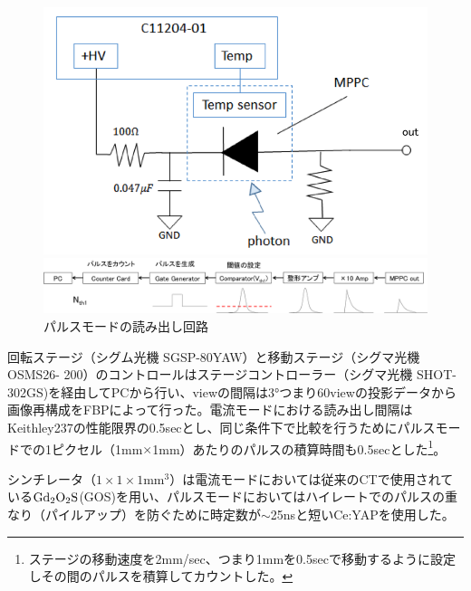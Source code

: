 \begin{figure}[H]
 \begin{minipage}{0.5\vsize}
 \hspace{3 cm}
   \includegraphics[bb=0.000000 0.000000 377.728774 242.859924,width=0.8\hsize]{image2/chapter5/read_circuit_pulse.png} 
  \vspace{0 cm}
   \end{minipage}
 \begin{minipage}{0.5\vsize}  
  \hspace{-1 cm}
 \includegraphics[bb=0.000000 0.000000 1008.876600 145.907938,width=1.5\hsize]{image2/chapter5/read_circuit_pulse2.png} 
 \end{minipage}
 \begin{center}
  \caption{パルスモードの読み出し回路}
  \label{fig:read_circuit_current}
  \end{center}
\end{figure}




回転ステージ（シグム光機 SGSP-80YAW）と移動ステージ（シグマ光機 OSMS26-
200）のコントロールはステージコントローラー（シグマ光機 SHOT-302GS)を経由してPCから行い、viewの間隔は3°つまり60viewの投影データから画像再構成をFBPによって行った。電流モードにおける読み出し間隔はKeithley237の性能限界の0.5secとし、同じ条件下で比較を行うためにパルスモードでの1ピクセル（1mm$\times$1mm）あたりのパルスの積算時間も0.5secとした\footnote{ステージの移動速度を2mm/sec、つまり1mmを0.5secで移動するように設定しその間のパルスを積算してカウントした。}。


シンチレータ（$1\times1\times1$mm$^3$）は電流モードにおいては従来のCTで使用されている$\rm Gd_2O_2S$(GOS)を用い、パルスモードにおいてはハイレートでのパルスの重なり（パイルアップ）を防ぐために時定数が$\sim$25nsと短いCe:YAPを使用した。

